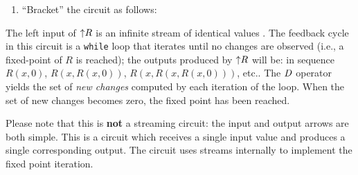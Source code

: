\begin{algorithm}
\begin{enumerate}[nosep, leftmargin=0pt, itemindent=0.5cm, label=\textbf{(\arabic{*})}]
 \begin{center}
 \end{center}
 \vspace{-2ex}
\item ``Bracket'' the circuit as follows:
%
\begin{center}
    \vspace{-2ex}
\end{center}
\end{enumerate}
\end{algorithm}

The left input of ${\uparrow}R$ is an infinite stream of identical values
.  The feedback cycle in this circuit is a
\texttt{while} loop that iterates until no changes are observed (i.e.,
a fixed-point of $R$ is reached); the outputs produced by ${\uparrow}R$
will be: in sequence $R(x,0)$, $R(x,R(x,0))$, $R(x,R(x,R(x,0)))$,
etc..  The $\mathit{D}$ operator yields the set of \emph{new changes} computed
by each iteration of the loop.  When the set of new changes becomes
zero, the fixed point has been reached.

Please note that this is \textbf{not} a streaming circuit: the input
and output arrows are both simple.  This is a circuit which receives a
single input value and produces a single corresponding output.  The
circuit uses streams internally to implement the fixed point
iteration.

